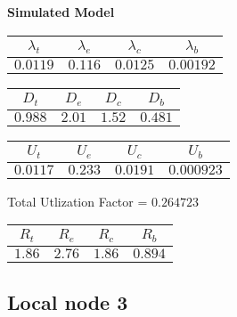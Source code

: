 \documentclass{article}
\begin{document}
\begin{minipage}{0.5\textwidth}
\centering	\textbf{Simulated Model}
\begin{table}[H]
\centering
\begin{tabular}{@{}cccc@{}}
\toprule
$\lambda_t$ & $\lambda_e$ & $\lambda_c$ & $\lambda_b$\\
\midrule
$0.0119$ & $0.116$ & $0.0125$ & $0.00192$\\
\bottomrule
\end{tabular}
\end{table}
\begin{table}[H]
\centering
\begin{tabular}{@{}cccc@{}}
\toprule
$D_t$ & $D_e$ & $D_c$ & $D_b$\\
\midrule
$0.988$ & $2.01$ & $1.52$ & $0.481$\\
\bottomrule
\end{tabular}
\end{table}\begin{table}[H]
\centering
\begin{tabular}{@{}cccc@{}}
\toprule
$U_t$ & $U_e$ & $U_c$ & $U_b$\\
\midrule
$0.0117$ & $0.233$ & $0.0191$ & $0.000923$\\
\bottomrule
\end{tabular}
\end{table}
\centering Total Utlization Factor = $0.264723$
\begin{table}[H]
\centering
\begin{tabular}{@{}cccc@{}}
\toprule
$R_t$ & $R_e$ & $R_c$ & $R_b$\\
\midrule
$1.86$ & $2.76$ & $1.86$ & $0.894$\\
\bottomrule
\end{tabular}
\end{table}
\end{minipage}\subsection{Local node 3}
\end{document}
